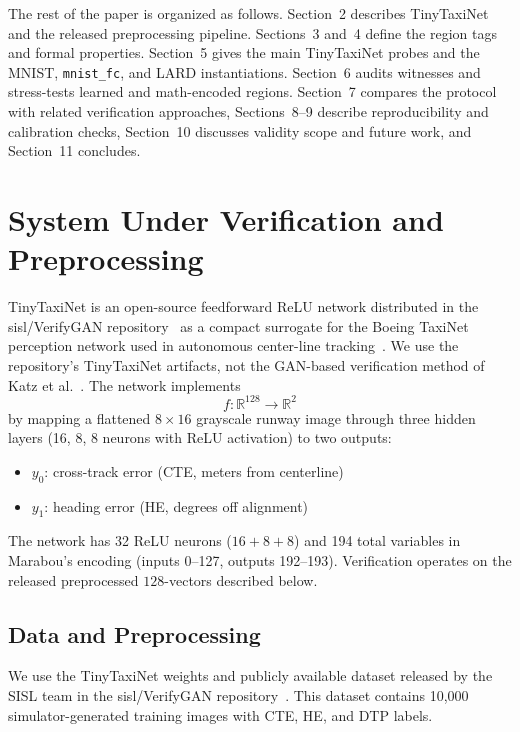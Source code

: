 \documentclass[twocolumn,smallextended,runningheads]{svjour3}
\begin{document}
The rest of the paper is organized as follows. Section~2 describes TinyTaxiNet and the released preprocessing pipeline. Sections~3 and~4 define the region tags and formal properties. Section~5 gives the main TinyTaxiNet probes and the MNIST, \texttt{mnist\_fc}, and LARD instantiations. Section~6 audits witnesses and stress-tests learned and math-encoded regions. Section~7 compares the protocol with related verification approaches, Sections~8--9 describe reproducibility and calibration checks, Section~10 discusses validity scope and future work, and Section~11 concludes.


\section{System Under Verification and Preprocessing}

TinyTaxiNet is an open-source feedforward ReLU network distributed in the sisl/VerifyGAN repository~\cite{katz2022} as a compact surrogate for the Boeing TaxiNet perception network used in autonomous center-line tracking~\cite{kadron2021,pasareanu2023closedloop}. We use the repository's TinyTaxiNet artifacts, not the GAN-based verification method of Katz et al.~\cite{katz2022}. The network implements
\[
f: \mathbb{R}^{128} \to \mathbb{R}^{2}
\]
by mapping a flattened $8 \times 16$ grayscale runway image through three hidden layers (16, 8, 8 neurons with ReLU activation) to two outputs:
\begin{itemize}[nosep]
  \item $y_0$: cross-track error (CTE, meters from centerline)
  \item $y_1$: heading error (HE, degrees off alignment)
\end{itemize}

The network has 32 ReLU neurons ($16 + 8 + 8$) and 194 total variables in Marabou's encoding (inputs 0--127, outputs 192--193). Verification operates on the released preprocessed $128$-vectors described below.

\subsection{Data and Preprocessing}

We use the TinyTaxiNet weights and publicly available dataset released by the SISL team in the sisl/VerifyGAN repository~\cite{katz2022}. This dataset contains 10{,}000 simulator-generated training images with CTE, HE, and DTP labels.
\end{document}
